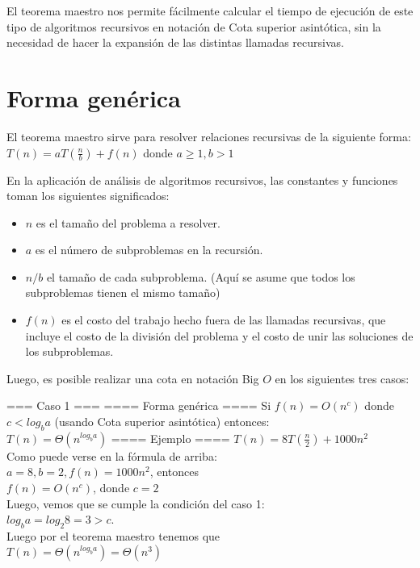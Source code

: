 \documentclass[12pt]{article}
\begin{document}
El teorema maestro nos permite fácilmente calcular el tiempo de ejecución de este tipo de algoritmos recursivos en notación de Cota superior asintótica, sin la necesidad de hacer la expansión de las distintas llamadas recursivas.

\section{Forma genérica}
El teorema maestro sirve para resolver relaciones recursivas de la siguiente forma:\\
$T(n)=aT(\frac{n}{b})+f(n)$ donde $a\geq 1,b>1$

En la aplicación de análisis de algoritmos recursivos, las constantes y funciones toman los siguientes significados:
\begin {itemize}
\item $n$ es el tamaño del problema a resolver.
\item $a$ es el número de subproblemas en la recursión.
\item $n/b$ el tamaño de cada subproblema. (Aquí se asume que todos los subproblemas tienen el mismo tamaño)
\item $f(n)$ es el costo del trabajo hecho fuera de las llamadas recursivas, que incluye el costo de la división del problema y el costo de unir las soluciones de los subproblemas.\\
\end{itemize}
Luego, es posible realizar una cota en notación Big $O$ en los siguientes tres casos:

=== Caso 1 ===
==== Forma genérica ====
Si $f(n)=O(n^c)$ donde $c<log_{b}a$ (usando Cota superior asintótica) entonces:\\
$T(n)=\Theta(n^{log_b a})$
==== Ejemplo ====
$T(n)=8T(\frac{n}{2})+1000n^2$\\
Como puede verse en la fórmula de arriba:\\
$a=8, b=2, f(n)=1000n^2$, entonces\\
$f(n)=O(n^c)$, donde $c=2$\\
Luego, vemos que se cumple la condición del caso 1:\\
$log_{b} a=log_{2} 8=3>c$.\\
Luego por el teorema maestro tenemos que\\
$T(n)=\Theta(n^{log_b a})=\Theta(n^3)$
\end{document}
